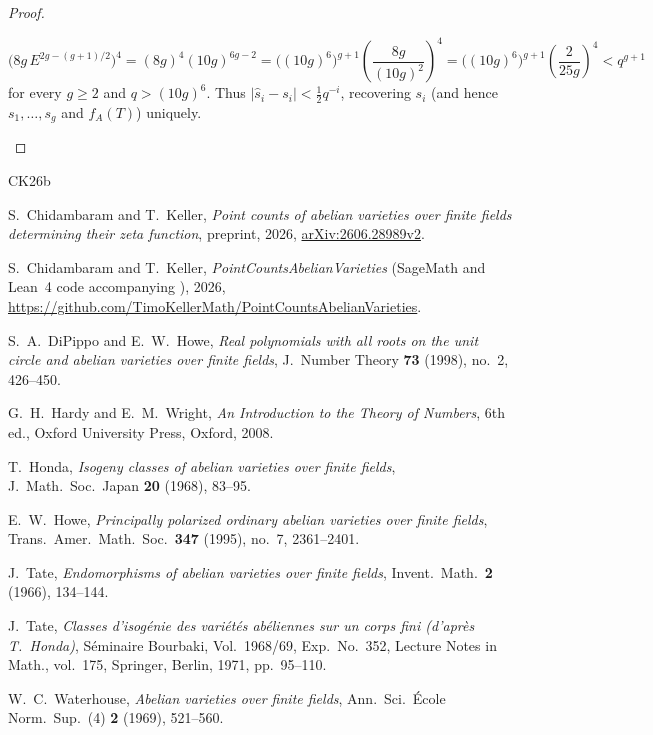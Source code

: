 \documentclass[11pt]{amsart}
\theoremstyle{remark}
\begin{document}
\begin{proof}
\begin{enumerate}
\[
\bigl(8g\, E^{2g - (g+1)/2}\bigr)^4 = (8g)^4 (10g)^{6g - 2} = \bigl((10g)^6\bigr)^{g+1} \left(\frac{8g}{(10g)^2}\right)^4 = \bigl((10g)^6\bigr)^{g+1} \left(\frac{2}{25g}\right)^4 < q^{g+1}
\]
for every $g \ge 2$ and $q > (10g)^6$. Thus $|\hat{s}_i - s_i| < \frac{1}{2} q^{-i}$, recovering $s_i$ (and hence $s_1, \dots, s_g$ and $f_A(T)$) uniquely.\qedhere
\end{enumerate}
\end{proof}

\begin{thebibliography}{CK26b}

S.~Chidambaram and T.~Keller, \emph{Point counts of abelian varieties over finite fields determining their zeta function}, preprint, 2026, \href{https://arxiv.org/abs/2606.28989}{arXiv:2606.28989v2}.

S.~Chidambaram and T.~Keller, \emph{PointCountsAbelianVarieties} (SageMath and Lean~4 code accompanying \cite{CK26}), 2026, \url{https://github.com/TimoKellerMath/PointCountsAbelianVarieties}.

S.~A.~DiPippo and E.~W.~Howe, \emph{Real polynomials with all roots on the unit circle and abelian varieties over finite fields}, J.~Number Theory \textbf{73} (1998), no.~2, 426--450.

G.~H.~Hardy and E.~M.~Wright, \emph{An Introduction to the Theory of Numbers}, 6th ed., Oxford University Press, Oxford, 2008.

T.~Honda, \emph{Isogeny classes of abelian varieties over finite fields}, J.~Math.\ Soc.\ Japan \textbf{20} (1968), 83--95.

E.~W.~Howe, \emph{Principally polarized ordinary abelian varieties over finite fields}, Trans.\ Amer.\ Math.\ Soc.\ \textbf{347} (1995), no.~7, 2361--2401.

J.~Tate, \emph{Endomorphisms of abelian varieties over finite fields}, Invent.\ Math.\ \textbf{2} (1966), 134--144.

J.~Tate, \emph{Classes d'isog\'enie des vari\'et\'es ab\'eliennes sur un corps fini (d'apr\`es T.~Honda)}, S\'eminaire Bourbaki, Vol.~1968/69, Exp.\ No.~352, Lecture Notes in Math., vol.~175, Springer, Berlin, 1971, pp.~95--110.

W.~C.~Waterhouse, \emph{Abelian varieties over finite fields}, Ann.\ Sci.\ \'Ecole Norm.\ Sup.~(4) \textbf{2} (1969), 521--560.

\end{thebibliography}
\end{document}
